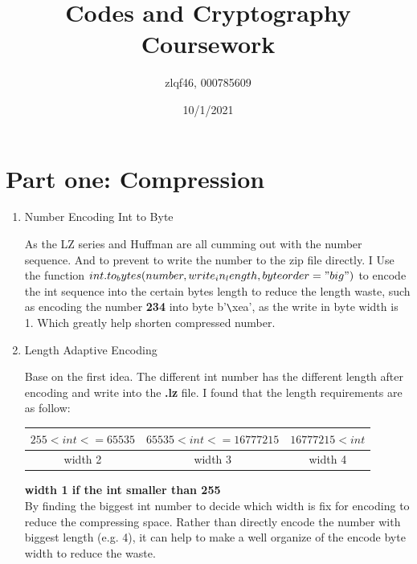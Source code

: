 \documentclass[margin 2cm]{report}
\title{\textbf{Codes and Cryptography Coursework}}
\author{zlqf46, 000785609}
\date{10/1/2021}
\begin{document}
\maketitle
\section[1]{\Large Part one: Compression}
\begin{enumerate}
\normalsize\item[1)]{Number Encoding Int to Byte}
\begin{spacing}{1.5}
\normalsize\indent\setlength{\parindent}{2em}As the LZ series and Huffman are all cumming out with the number sequence. And to prevent to write the number to the zip file directly. I Use the function $int.to_bytes(number, write_in_length, byteorder="big")$ to encode the int sequence into the certain bytes length to reduce the length waste, such as encoding the number \textbf{234} into byte b'\verb|\|xea', as the write in byte width is 1. Which greatly help shorten compressed number.
\end{spacing}

\normalsize\item[2)]{Length Adaptive Encoding}
\begin{spacing}{1.5}
\normalsize\indent\setlength{\parindent}{2em}Base on the first idea. The different int number has the different length after encoding and write into the \textbf{.lz} file. I found that the length requirements are as follow:
\newline
\newline
\begin{tabular}{|c|c|c|}
\hline
$255<int<=65535$&$65535<int<=16777215$&$16777215<int$\\
\hline
width 2&width 3&width 4\\
\hline
\end{tabular}
\newline\normalsize\textbf{width 1 if the int smaller than 255}\\
By finding the biggest int number to decide which width is fix for encoding to reduce the compressing space. Rather than directly encode the number with biggest length (e.g. 4), it can help to make a well organize of the encode byte width to reduce the waste.
\end{spacing}


\end{enumerate}
\end{document}
